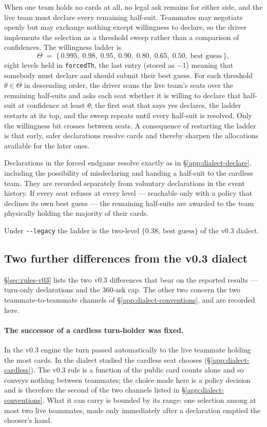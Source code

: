 When one team holds no cards at all, no legal ask remains for either side, and
the live team must declare every remaining half-suit. Teammates may negotiate
openly but may exchange nothing except willingness to declare, so the driver
implements the selection as a threshold sweep rather than a comparison of
confidences. The willingness ladder is
\[
  \Theta \;=\; \{\,0.995,\; 0.98,\; 0.95,\; 0.90,\; 0.80,\; 0.65,\; 0.50,\;
  \text{best guess}\,\},
\]
eight levels held in \texttt{forcedTh}, the last entry (stored as $-1$) meaning
that somebody must declare and should submit their best guess. For each
threshold $\theta \in \Theta$ in descending order, the driver scans the live
team's seats over the remaining half-suits and asks each seat whether it is
willing to declare that half-suit at confidence at least $\theta$; the first
seat that says yes declares, the ladder restarts at its top, and the sweep
repeats until every half-suit is resolved. Only the willingness bit crosses
between seats. A consequence of restarting the ladder is that early, safer
declarations resolve cards and thereby sharpen the allocations available for the
later ones.

Declarations in the forced endgame resolve exactly as in
\S\ref{app:dialect-declare}, including the possibility of misdeclaring and
handing a half-suit to the cardless team. They are recorded separately from
voluntary declarations in the event history. If every seat refuses at every
level --- reachable only with a policy that declines its own best guess --- the
remaining half-suits are awarded to the team physically holding the majority of
their cards.

Under \texttt{-{}-legacy} the ladder is the two-level
$\{0.38,\ \text{best guess}\}$ of the v0.3 dialect.

\subsection{Two further differences from the v0.3 dialect}
\label{app:dialect-vthree}

\S\ref{sec:rules-v03} lists the two v0.3 differences that bear on the reported
results --- turn-only declarations and the 360-ask cap. The other two concern
the two teammate-to-teammate channels of \S\ref{app:dialect-conventions}, and
are recorded here.

\paragraph{The successor of a cardless turn-holder was fixed.} In the v0.3
engine \cite{fishbot03} the turn passed automatically to the live teammate
holding the most cards. In the dialect studied the cardless seat chooses
(\S\ref{app:dialect-cardless}). The v0.3 rule is a function of the public card
counts alone and so conveys nothing between teammates; the choice made here is a
policy decision and is therefore the second of the two channels listed in
\S\ref{app:dialect-conventions}. What it can carry is bounded by its range: one
selection among at most two live teammates, made only immediately after a
declaration emptied the chooser's hand.

